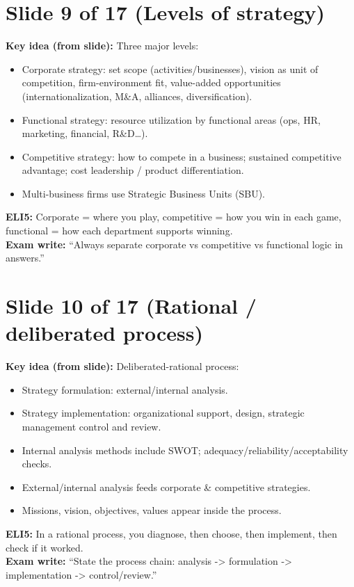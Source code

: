 \documentclass[11pt,a4paper]{article}
\begin{document}
\section*{Slide 9 of 17 (Levels of strategy)}
\textbf{Key idea (from slide):} Three major levels:
\begin{itemize}
  \item Corporate strategy: set scope (activities/businesses), vision as unit of competition, firm-environment fit, value-added opportunities (internationalization, M\&A, alliances, diversification).
  \item Functional strategy: resource utilization by functional areas (ops, HR, marketing, financial, R\&D…).
  \item Competitive strategy: how to compete in a business; sustained competitive advantage; cost leadership / product differentiation.
  \item Multi-business firms use Strategic Business Units (SBU).
\end{itemize}
\textbf{ELI5:} Corporate = where you play, competitive = how you win in each game, functional = how each department supports winning.\\
\textbf{Exam write:} ``Always separate corporate vs competitive vs functional logic in answers.''

\section*{Slide 10 of 17 (Rational / deliberated process)}
\textbf{Key idea (from slide):} Deliberated-rational process:
\begin{itemize}
  \item Strategy formulation: external/internal analysis.
  \item Strategy implementation: organizational support, design, strategic management control and review.
  \item Internal analysis methods include SWOT; adequacy/reliability/acceptability checks.
\item External/internal analysis feeds corporate \& competitive strategies.
  \item Missions, vision, objectives, values appear inside the process.
\end{itemize}
\textbf{ELI5:} In a rational process, you diagnose, then choose, then implement, then check if it worked.\\
\textbf{Exam write:} ``State the process chain: analysis -> formulation -> implementation -> control/review.''
\end{document}
